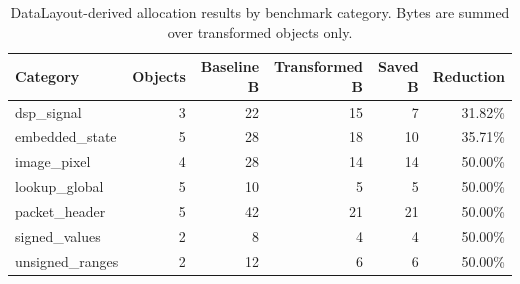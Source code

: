 \begin{table}[t]
\centering
\caption{DataLayout-derived allocation results by benchmark category. Bytes are summed over transformed objects only.}
\label{tab:allocation-categories}
\small
\begin{tabular}{lrrrrr}
\toprule
Category & Objects & Baseline B & Transformed B & Saved B & Reduction \\
\midrule
dsp\_signal & 3 & 22 & 15 & 7 & 31.82\% \\
embedded\_state & 5 & 28 & 18 & 10 & 35.71\% \\
image\_pixel & 4 & 28 & 14 & 14 & 50.00\% \\
lookup\_global & 5 & 10 & 5 & 5 & 50.00\% \\
packet\_header & 5 & 42 & 21 & 21 & 50.00\% \\
signed\_values & 2 & 8 & 4 & 4 & 50.00\% \\
unsigned\_ranges & 2 & 12 & 6 & 6 & 50.00\% \\
\bottomrule
\end{tabular}
\end{table}
